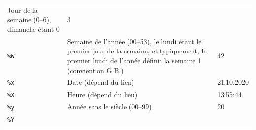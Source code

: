 \documentclass[
  11pt,
]{book}
\numberwithin{equation}{section}
\numberwithin{countremarque}{section}
\begin{document}
\begin{longtable}[]{@{}lll@{}}
\begin{minipage}[t]{0.42\columnwidth}
Jour de la semaine (0--6), dimanche étant 0\strut
\end{minipage} & \begin{minipage}[t]{0.29\columnwidth}\raggedright
3\strut
\end{minipage}\tabularnewline
\begin{minipage}[t]{0.20\columnwidth}\raggedright
\texttt{\%W}\strut
\end{minipage} & \begin{minipage}[t]{0.42\columnwidth}\raggedright
Semaine de l'année (00--53), le lundi étant le premier jour de la semaine, et typiquement, le premier lundi de l'année définit la semaine 1 (conviention G.B.)\strut
\end{minipage} & \begin{minipage}[t]{0.29\columnwidth}\raggedright
42\strut
\end{minipage}\tabularnewline
\begin{minipage}[t]{0.20\columnwidth}\raggedright
\texttt{\%x}\strut
\end{minipage} & \begin{minipage}[t]{0.42\columnwidth}\raggedright
Date (dépend du lieu)\strut
\end{minipage} & \begin{minipage}[t]{0.29\columnwidth}\raggedright
21.10.2020\strut
\end{minipage}\tabularnewline
\begin{minipage}[t]{0.20\columnwidth}\raggedright
\texttt{\%X}\strut
\end{minipage} & \begin{minipage}[t]{0.42\columnwidth}\raggedright
Heure (dépend du lieu)\strut
\end{minipage} & \begin{minipage}[t]{0.29\columnwidth}\raggedright
13:55:44\strut
\end{minipage}\tabularnewline
\begin{minipage}[t]{0.20\columnwidth}\raggedright
\texttt{\%y}\strut
\end{minipage} & \begin{minipage}[t]{0.42\columnwidth}\raggedright
Année sans le siècle (00--99)\strut
\end{minipage} & \begin{minipage}[t]{0.29\columnwidth}\raggedright
20\strut
\end{minipage}\tabularnewline
\begin{minipage}[t]{0.20\columnwidth}\raggedright
\texttt{\%Y}\strut
\end{minipage} & \begin{minipage}[t]{0.42\columnwidth}\raggedright

\end{minipage}
\end{longtable}
\end{document}
